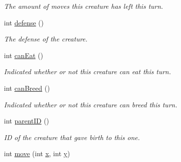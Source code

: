 \begin{DoxyCompactItemize}
\begin{DoxyCompactList}\small\item\em \-The amount of moves this creature has left this turn. \end{DoxyCompactList}\item 
\hypertarget{classCreature_a9334ffd8592fd4896246d47c39f1a50e}{int \hyperlink{classCreature_a9334ffd8592fd4896246d47c39f1a50e}{defense} ()}\label{classCreature_a9334ffd8592fd4896246d47c39f1a50e}

\begin{DoxyCompactList}\small\item\em \-The defense of the creature. \end{DoxyCompactList}\item 
\hypertarget{classCreature_ae18ab6327bf0303ce8a7cbae467e78bd}{int \hyperlink{classCreature_ae18ab6327bf0303ce8a7cbae467e78bd}{can\-Eat} ()}\label{classCreature_ae18ab6327bf0303ce8a7cbae467e78bd}

\begin{DoxyCompactList}\small\item\em \-Indicated whether or not this creature can eat this turn. \end{DoxyCompactList}\item 
\hypertarget{classCreature_a6f777566f7257c55d9bdb16cb4fd416c}{int \hyperlink{classCreature_a6f777566f7257c55d9bdb16cb4fd416c}{can\-Breed} ()}\label{classCreature_a6f777566f7257c55d9bdb16cb4fd416c}

\begin{DoxyCompactList}\small\item\em \-Indicated whether or not this creature can breed this turn. \end{DoxyCompactList}\item 
\hypertarget{classCreature_a1b29e23722ff1b64f5c85bf83ba58280}{int \hyperlink{classCreature_a1b29e23722ff1b64f5c85bf83ba58280}{parent\-I\-D} ()}\label{classCreature_a1b29e23722ff1b64f5c85bf83ba58280}

\begin{DoxyCompactList}\small\item\em \-I\-D of the creature that gave birth to this one. \end{DoxyCompactList}\item 
\hypertarget{classCreature_a544dd080035adbb2bda1b963e7110732}{int \hyperlink{classCreature_a544dd080035adbb2bda1b963e7110732}{move} (int \hyperlink{classCreature_a356a4d67f5e39929cbd83303fd9a1a32}{x}, int \hyperlink{classCreature_a3d5b3216f5d659a16f5ea9dacc5e3463}{y})}\label{classCreature_a544dd080035adbb2bda1b963e7110732}


\end{DoxyCompactItemize}
